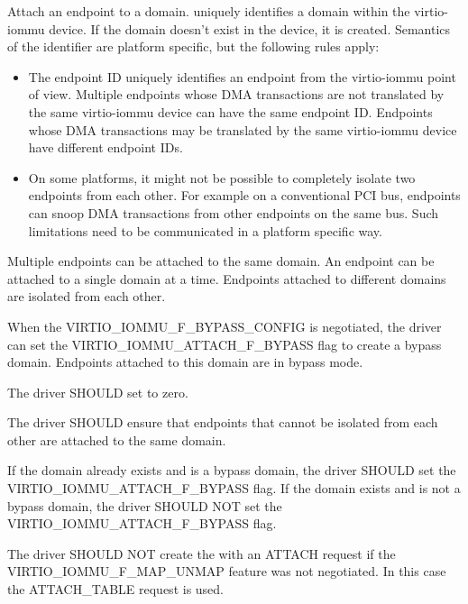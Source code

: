 Attach an endpoint to a domain.  uniquely identifies a
domain within the virtio-iommu device. If the domain doesn't exist in the
device, it is created. Semantics of the  identifier are
platform specific, but the following rules apply:

\begin{itemize}
\item The endpoint ID uniquely identifies an endpoint from the
  virtio-iommu point of view. Multiple endpoints whose DMA transactions
  are not translated by the same virtio-iommu device can have the same
  endpoint ID. Endpoints whose DMA transactions may be translated by the
  same virtio-iommu device have different endpoint IDs.

\item On some platforms, it might not be possible to completely isolate
  two endpoints from each other. For example on a conventional PCI bus,
  endpoints can snoop DMA transactions from other endpoints on the same
  bus. Such limitations need to be communicated in a platform specific
  way.
\end{itemize}

Multiple endpoints can be attached to the same domain. An endpoint can be
attached to a single domain at a time. Endpoints attached to different
domains are isolated from each other.

When the VIRTIO_IOMMU_F_BYPASS_CONFIG is negotiated, the driver
can set the VIRTIO_IOMMU_ATTACH_F_BYPASS flag to create a bypass
domain. Endpoints attached to this domain are in bypass mode.


The driver SHOULD set  to zero.

The driver SHOULD ensure that endpoints that cannot be isolated from each
other are attached to the same domain.

If the domain already exists and is a bypass domain, the driver
SHOULD set the VIRTIO_IOMMU_ATTACH_F_BYPASS flag. If the domain
exists and is not a bypass domain, the driver SHOULD NOT set the
VIRTIO_IOMMU_ATTACH_F_BYPASS flag.

The driver SHOULD NOT create the  with an ATTACH
request if the VIRTIO_IOMMU_F_MAP_UNMAP feature was not
negotiated. In this case the ATTACH_TABLE request is used.

